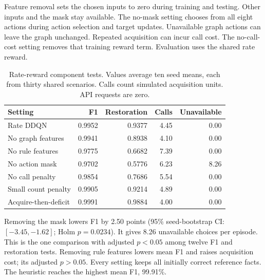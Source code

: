 Feature removal sets the chosen inputs to zero during training and testing.
Other inputs and the mask stay available. The no-mask setting chooses
from all eight actions during action selection and target updates.
Unavailable graph actions can leave the graph unchanged. Repeated
acquisition can incur call cost. The no-call-cost setting removes that
training reward term. Evaluation uses the shared rate reward.

\begin{table}[t]

\centering

\caption{Rate-reward component tests. Values average ten seed means, each from thirty shared scenarios. Calls count simulated acquisition units. API requests are zero.}

\label{tab:rate_ablation}

\scriptsize

\begin{tabular}{lrrrr}

\toprule

Setting & F1 & Restoration & Calls & Unavailable \\

\midrule

Rate DDQN & 0.9952 & 0.9377 & 4.45 & 0.00 \\

No graph features & 0.9941 & 0.8938 & 4.10 & 0.00 \\

No rule features & 0.9775 & 0.6682 & 7.39 & 0.00 \\

No action mask & 0.9702 & 0.5776 & 6.23 & 8.26 \\

No call penalty & 0.9854 & 0.7686 & 5.54 & 0.00 \\

Small count penalty & 0.9905 & 0.9214 & 4.89 & 0.00 \\

Acquire-then-deficit & 0.9991 & 0.9884 & 4.00 & 0.00 \\

\bottomrule

\end{tabular}

\end{table}

Removing the mask lowers F1 by 2.50 points
(95\% seed-bootstrap CI: $[-3.45,-1.62]$; Holm $p=0.0234$).
It gives 8.26 unavailable choices per episode. This is the one comparison
with adjusted $p<0.05$ among twelve F1 and restoration tests.
Removing rule features lowers mean F1 and raises acquisition cost;
its adjusted $p>0.05$. Every setting keeps all initially correct
reference facts. The heuristic reaches the highest mean F1, 99.91\%.

